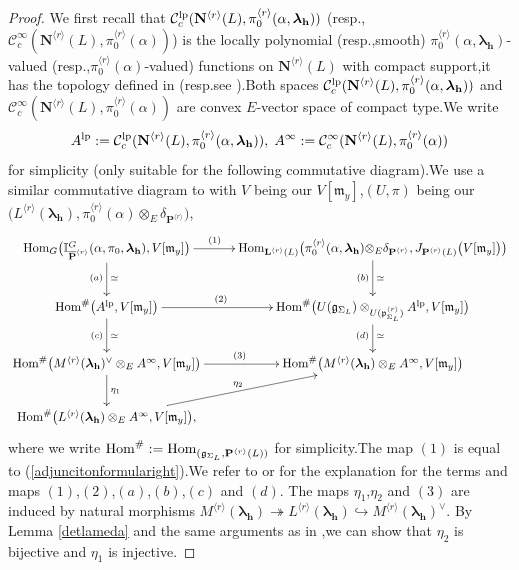 \documentclass[SecEq,CM,GP]{degruyter-crelle} %
\theoremstyle{plain}
\newcommand{\homo}{{\rm Hom}}
\newcommand{\lamoverx}{{L^{\lrr}({\bm\lambda}_\bh)}}
\newcommand{\lrr}{{\langle r\rangle}}
\newcommand{\lp}{{\rm lp}}
\newcommand{\op}{{\overline{{\mathbf{P}}}}}
\newcommand{\te}{{\otimes_E}}
\newcommand{\BI}{{\mathbb{I}}}
\newcommand{\bL}{{\mathbf{L}}}
\newcommand{\bN}{{\mathbf{N}}}
\newcommand{\bP}{{\mathbf{P}}}
\newcommand{\bh}{{\mathbf{h}}}
\newcommand{\cC}{\mathcal C}
\newcommand{\fm}{{\mathfrak{m}}}
\begin{document}
\begin{proof}
We first recall that $\cC^{\lp}_c(\bN^{\lrr}(L),\pi_0^{\lrr}(\alpha,{\bm\lambda}_\bh))$ (resp.,\;$\cC^{\infty}_c(\bN^{\lrr}(L),\pi_0^{\lrr}(\alpha))$) is the locally polynomial (resp.,\;smooth) $\pi_0^{\lrr}(\alpha,{\bm\lambda}_\bh)$-valued (resp.,\;$\pi_0^{\lrr}(\alpha)$-valued) functions on $\bN^{\lrr}(L)$ with compact support,\;it has the topology defined in \cite[(2.5)]{emerton2007jacquet} (resp.\;see \cite[(2.2)]{emerton2007jacquet}).\;Both spaces $\cC^{\lp}_c(\bN^{\lrr}(L),\pi_0^{\lrr}(\alpha,{\bm\lambda}_\bh))$ and $\cC^{\infty}_c(\bN^{\lrr}(L),\pi_0^{\lrr}(\alpha))$ are convex $E$-vector space of compact type.\;We write \[A^{\lp}:=\cC^{\lp}_c(\bN^{\lrr}(L),\pi_0^{\lrr}(\alpha,{\bm\lambda}_\bh)),\; A^{\infty}:=\cC^{\infty}_c(\bN^{\lrr}(L),\pi_0^{\lrr}(\alpha))\] for simplicity (only suitable for the following commutative diagram).\;We use a similar commutative diagram to \cite[proof of Theorem 4.8]{bergdall2018adjunction} with $V$  being our $V[\fm_y]$,\;$(U,\pi)$ being our $\Big(\lamoverx,\pi_0^{\lrr}(\alpha)\te \delta_{\bP^{\lrr}}\Big)$,\;
\[\xymatrix{
	\homo_{G}\big(\BI_{\op^{\lrr}}^G(\alpha,\pi_0,{\bm\lambda}_\bh),V[\fm_y]\big) \ar[d]^{\simeq}_{(a)} \ar[r]^{(1)\hspace{40pt}} & \homo_{\bL^{\lrr}(L)}\big(\pi_0^{\lrr}(\alpha,{\bm\lambda}_\bh)\te \delta_{\bP^{\lrr}}, J_{\bP^{\lrr}(L)}\big(V[\fm_y]\big)\big) \ar[d]^{\simeq}_{(b)}  \\
	\homo^\#\big(A^{\lp},V[\fm_y]\big)  \ar[r]^{(2)\hspace{30pt}} \ar[d]^{\simeq}_{(c)} & \homo^\#\big(U(\mathfrak{g}_{\Sigma_L})\otimes_ {U(\mathfrak{p}^{\lrr}_{\Sigma_L})}A^{\lp},V[\fm_y]\big)\ar[d]^{\simeq}_{(d)}\\
	\homo^\#\big(M^{\lrr}({\bm\lambda}_\bh)^\vee\otimes_EA^{\infty},V[\fm_y]\big)  \ar[r]^{(3)} \ar[d]^{\eta_1} & \homo^\#\big(M^{\lrr}({\bm\lambda}_\bh)\otimes_EA^{\infty},V[\fm_y]\big)\\
	\homo^\#\big(L^{\lrr}({\bm\lambda}_\bh)\otimes_EA^{\infty},V[\fm_y]\big),  \ar[ur]^{\eta_2} &
}\]
where we write  $\homo^\#:=\homo_{(\mathfrak{g}_{\Sigma_L},\bP^{\lrr}(L))}$ for simplicity.\;The map $(1)$ is equal to (\ref{adjuncitonformularight}).\;We refer to 
\cite[Theorem 4.8]{bergdall2018adjunction} or \cite[Proposition 4.7]{2019DINGSimple} for the explanation for the terms and maps $(1)$,\;$(2)$,\;$(a)$,\;$(b)$,\;$(c)$ and $(d)$.\;
The maps $\eta_1$,\;$\eta_2$ and $(3)$ are induced by natural morphisms $M^{\lrr}({\bm\lambda}_\bh)\twoheadrightarrow \lamoverx\hookrightarrow M^{\lrr}({\bm\lambda}_\bh)^\vee$. By Lemma \ref{detlameda} and the same arguments as in \cite[Proposition 4.9]{bergdall2018adjunction},\;we can show that $\eta_2$ is bijective and $\eta_1$ is injective.\;


\end{proof}
\end{document}
